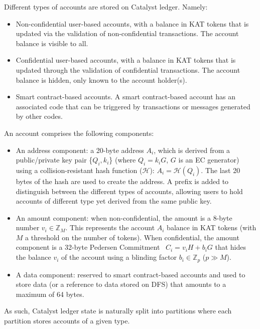 Different types of accounts are stored on Catalyst ledger. Namely:

\begin{itemize}
\item Non-confidential user-based accounts, with a balance in KAT tokens that is updated via the validation of non-confidential transactions. The account balance is visible to all.
\item Confidential user-based accounts, with a balance in KAT tokens that is updated through the validation of confidential transactions. The account balance is hidden, only known to the account holder(s).
\item Smart contract-based accounts. A smart contract-based account has an associated code that can be triggered by transactions or messages generated by other codes.
\end{itemize}

An account comprises the following components: 

\begin{itemize}
\item An address component: a 20-byte address $A_{i}$, which is derived from a public/private key pair \{$Q_{i},k_{i}$\} (where $Q_i= k_{i}G$, $G$ is an EC generator) using a collision-resistant hash function ($\mathcal{H}$): $A_{i} = \mathcal{H}(Q_{i})$. The last 20 bytes of the hash are used to create the address. A prefix is added to distinguish between the different types of accounts, allowing users to hold accounts of different type yet derived from the same public key. 
\item An amount component: when non-confidential, the amount is a 8-byte number $v_{i} \in \mathbb{Z}_M$. This represents the account $A_{i}$ balance in KAT tokens (with $M$ a threshold on the number of tokens). When confidential, the amount component is a 32-byte Pedersen Commitment~\cite{confidential} $C_{i} = v_{i}H + b_{i}G$ that hides the balance $v_i$ of the account using a blinding factor $b_{i} \in \mathbb{Z}_p$ ($p \gg M$).
\item A data component: reserved to smart contract-based accounts and used to store data (or a reference to data stored on DFS) that amounts to a maximum of 64 bytes. 
\end{itemize}

As such, Catalyst ledger state is naturally split into partitions where each partition stores accounts of a given type.

